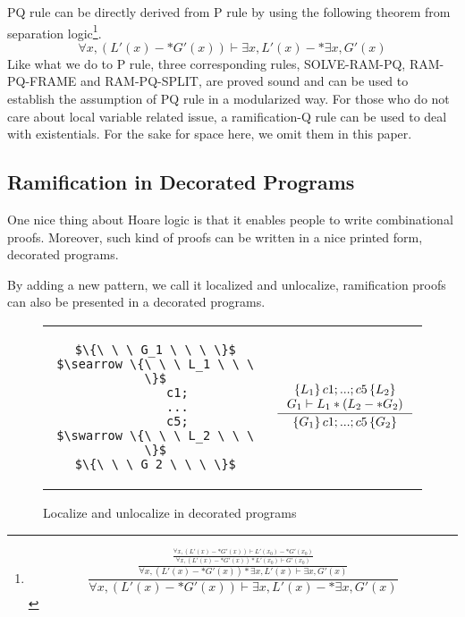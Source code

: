 PQ rule can be directly derived from P rule by using the following theorem from separation logic\footnote{
$$\frac{\frac{\frac{\forall x, (L' (x) -* G' (x)) \vdash L' (x_0) -* G' (x_0)}{\forall x, (L' (x) -* G' (x)) * L' (x_0) \vdash G' (x_0)}}
{\forall x, (L' (x) -* G' (x)) * \exists x, L' (x) \vdash \exists x, G' (x)}}
{\forall x, (L' (x) -* G' (x)) \vdash \exists x, L' (x) -* \exists x, G' (x)}$$
}.
$$\forall x, (L' (x) -* G' (x)) \vdash \exists x, L' (x) -* \exists x, G' (x)$$
Like what we do to P rule, three corresponding rules, SOLVE-RAM-PQ, RAM-PQ-FRAME and RAM-PQ-SPLIT, are proved sound and can be used to establish the assumption of PQ rule in a modularized way. For those who do not care about local variable related issue, a ramification-Q rule can be used to deal with existentials. For the sake for space here, we omit them in this paper.

\subsection{Ramification in Decorated Programs}

One nice thing about Hoare logic is that it enables people to write combinational proofs. Moreover, such kind of proofs can be written in a nice printed form, decorated programs. %

By adding a new pattern, we call it localized and unlocalize, ramification proofs can also be presented in a decorated programs.

\begin{figure}[h]
\begin{tabular}{c | c}
\begin{lstlisting}
$\{\ \ \ G_1 \ \ \ \}$
$\searrow \{\ \ \ L_1 \ \ \ \}$
      c1;
      ...
      c5;
$\swarrow \{\ \ \ L_2 \ \ \ \}$
$\{\ \ \ G_2 \ \ \ \}$
\end{lstlisting}
&
$$
\inference[]
{\triple{L_1}{c1;...;c5}{L_2} \\
G_1 \vdash L_1 * (L_2 -* G_2)
}
{\triple{G_1}{c1;...;c5}{G_2}}
$$
 \\
\end{tabular}
\caption{Localize and unlocalize in decorated programs}
\label{figure:lul}
\end{figure}

